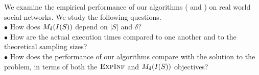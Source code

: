 
We examine the empirical performance of our algorithms (\infprobheu{} and \multicritalgo{})
on real world social networks. We study the following questions.\\
$\bullet$ How does $\mbox{$M_{\delta}(I(S))$}$ depend on $|S|$ and $\delta$?\\
$\bullet$ How are the actual execution times compared to one another and to the theoretical
sampling sizes? \\
$\bullet$ How does the performance of our algorithms compare with the solution to the \infmax{}
problem, in terms of both the $\textsc{ExpInf}$ and $\mbox{$M_{\delta}(I(S))$}$ objectives? 

%
\vspace{-0.05in}
